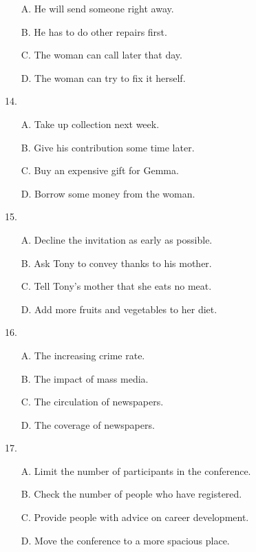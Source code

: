 \documentclass[UTF8,11pt]{ctexart}
\begin{document}
\begin{itemize}[leftmargin=2em,itemsep=.2em,topsep=.4em]\item[A.] He will send someone right away.
\item[B.] He has to do other repairs first.
\item[C.] The woman can call later that day.
\item[D.] The woman can try to fix it herself.
\end{itemize}

14.


\begin{itemize}[leftmargin=2em,itemsep=.2em,topsep=.4em]\item[A.] Take up collection next week.
\item[B.] Give his contribution some time later.
\item[C.] Buy an expensive gift for Gemma.
\item[D.] Borrow some money from the woman.
\end{itemize}

15.


\begin{itemize}[leftmargin=2em,itemsep=.2em,topsep=.4em]\item[A.] Decline the invitation as early as possible.
\item[B.] Ask Tony to convey thanks to his mother.
\item[C.] Tell Tony’s mother that she eats no meat.
\item[D.] Add more fruits and vegetables to her diet.
\end{itemize}

16.


\begin{itemize}[leftmargin=2em,itemsep=.2em,topsep=.4em]\item[A.] The increasing crime rate.
\item[B.] The impact of mass media.
\item[C.] The circulation of newspapers.
\item[D.] The coverage of newspapers.
\end{itemize}

17.


\begin{itemize}[leftmargin=2em,itemsep=.2em,topsep=.4em]\item[A.] Limit the number of participants in the conference.
\item[B.] Check the number of people who have registered.
\item[C.] Provide people with advice on career development.
\item[D.] Move the conference to a more spacious place.
\end{itemize}
\end{document}
